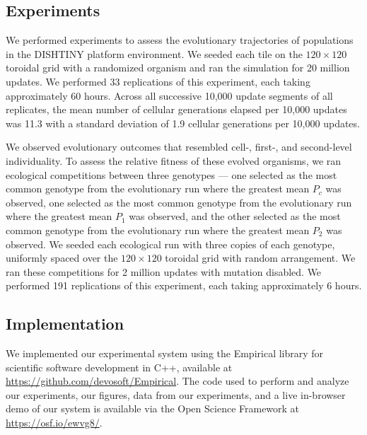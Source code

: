 \subsection{Experiments}

We performed experiments to assess the evolutionary trajectories of populations in the DISHTINY platform environment.
We seeded each tile on the $120 \times 120$ toroidal grid with a randomized organism and ran the simulation for 20 million updates.
We performed 33 replications of this experiment, each taking approximately 60 hours.
Across all successive 10,000 update segments of all replicates, the mean number of cellular generations elapsed per 10,000 updates was 11.3 with a standard deviation of 1.9 cellular generations per 10,000 updates.

We observed evolutionary outcomes that resembled cell-, first-, and second-level individuality.
To assess the relative fitness of these evolved organisms, we ran ecological competitions between three genotypes --- one selected as the most common genotype from the evolutionary run where the greatest mean $P_{c}$ was observed, one selected as the most common genotype from the evolutionary run where the greatest mean $P_1$ was observed, and the other selected as the most common genotype from the evolutionary run where the greatest mean $P_2$ was observed.
We seeded each ecological run with three copies of each genotype, uniformly spaced over the $120 \times 120$ toroidal grid with random arrangement.
We ran these competitions for 2 million updates with mutation disabled.
We performed 191 replications of this experiment, each taking approximately 6 hours.

\subsection{Implementation}

We implemented our experimental system using the Empirical library for scientific software development in C++, available at \url{https://github.com/devosoft/Empirical}.  The code used to perform and analyze our experiments, our figures, data from our experiments, and a live in-browser demo of our system is available via the Open Science Framework at \url{https://osf.io/ewvg8/}.
